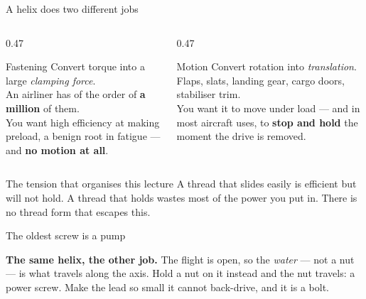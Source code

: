 \documentclass[aspectratio=169,10pt]{beamer}
\begin{document}
\begin{frame}{A helix does two different jobs}
\begin{columns}[T]
\begin{column}{0.47\textwidth}
\begin{block}{Fastening}
Convert torque into a large \emph{clamping force}.\\[4pt]
An airliner has of the order of \textbf{a million} of them.\\[4pt]
You want high efficiency at making preload, a benign root in fatigue --- and
\textbf{no motion at all}.
\end{block}
\end{column}
\begin{column}{0.47\textwidth}
\begin{block}{Motion}
Convert rotation into \emph{translation}.\\[4pt]
Flaps, slats, landing gear, cargo doors, stabiliser trim.\\[4pt]
You want it to move under load --- and in most aircraft uses, to \textbf{stop and hold}
the moment the drive is removed.
\end{block}
\end{column}
\end{columns}
\vfill
\begin{alertblock}{The tension that organises this lecture}
A thread that slides easily is efficient but will not hold. A thread that holds wastes most of the
power you put in. There is no thread form that escapes this.
\end{alertblock}
\end{frame}

\begin{frame}{The oldest screw is a pump}
\centering
\resizebox{!}{4.9cm}{}
\vfill
\raggedright
\textbf{The same helix, the other job.} The flight is open, so the \emph{water} --- not a nut ---
is what travels along the axis. Hold a nut on it instead and the nut travels: a power screw. Make
the lead so small it cannot back-drive, and it is a bolt.
\end{frame}
\end{document}
